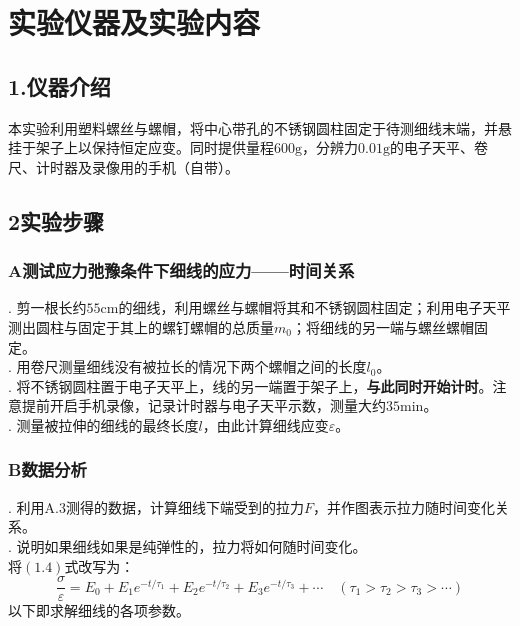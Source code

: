 \documentclass{ctexart}
\begin{document}
\section{实验仪器及实验内容}
\subsection*{1.\quad 仪器介绍}
本实验利用塑料螺丝与螺帽，将中心带孔的不锈钢圆柱固定于待测细线末端，并悬挂于架子上以保持恒定应变。同时提供量程$600\mathrm{g}$，分辨力$0.01\mathrm{g}$的电子天平、卷尺、计时器及录像用的手机（自带）。

\subsection*{2\quad 实验步骤}
\subsubsection*{A\quad 测试应力弛豫条件下细线的应力——时间关系}

. 剪一根长约$55\mathrm{cm}$的细线，利用螺丝与螺帽将其和不锈钢圆柱固定；利用电子天平测出圆柱与固定于其上的螺钉螺帽的总质量$m_0$；将细线的另一端与螺丝螺帽固定。  \\ 
. 用卷尺测量细线没有被拉长的情况下两个螺帽之间的长度$l_0$。   \\
. 将不锈钢圆柱置于电子天平上，线的另一端置于架子上，\textbf{与此同时开始计时}。注意提前开启手机录像，记录计时器与电子天平示数，测量大约$35\mathrm{min}$。   \\
. 测量被拉伸的细线的最终长度$l$，由此计算细线应变$\varepsilon$。 \\

\subsubsection*{B\quad 数据分析}
. 利用A.3测得的数据，计算细线下端受到的拉力$F$，并作图表示拉力随时间变化关系。 \\
. 说明如果细线如果是纯弹性的，拉力将如何随时间变化。\\

将$(1.4)$式改写为：
\begin{equation}
  \frac{\sigma}{\varepsilon}=E_0+E_1e^{-t/\tau_1}+E_2e^{-t/\tau_2}+E_3e^{-t/\tau_3}+\cdots \quad (\tau_1>\tau_2>\tau_3>\cdots)
\end{equation}
以下即求解细线的各项参数。\\
\end{document}

